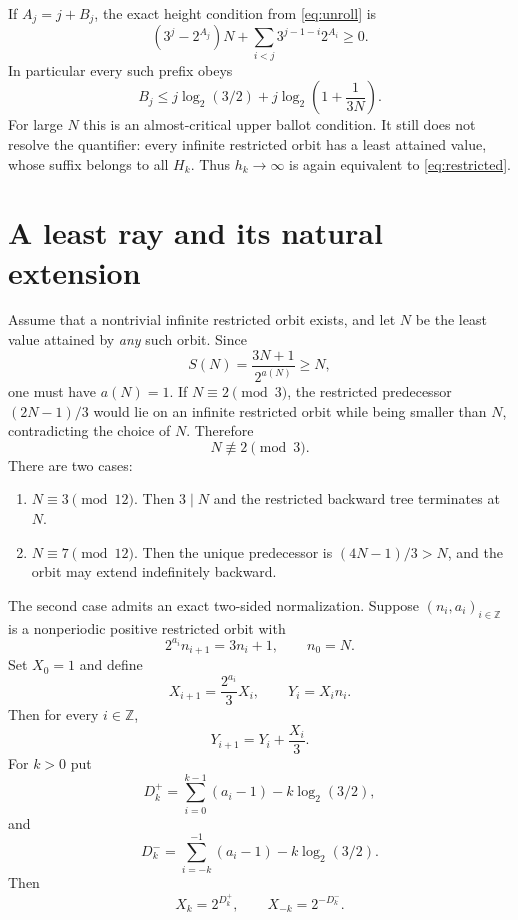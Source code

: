 \documentclass[11pt,reqno]{amsart}
\theoremstyle{plain}
\theoremstyle{definition}
\numberwithin{equation}{section}
\newcommand{\Z}{\mathbb{Z}}
\begin{document}
If $A_j=j+B_j$, the exact height condition from \eqref{eq:unroll} is
\begin{equation}\label{eq:heightcond}
(3^j-2^{A_j})N+
\sum_{i<j}3^{j-1-i}2^{A_i}\ge0.
\end{equation}
In particular every such prefix obeys
\begin{equation}\label{eq:ballot}
B_j
\le
j\log_2(3/2)+
j\log_2\left(1+\frac1{3N}\right).
\end{equation}
For large $N$ this is an almost-critical upper ballot condition.  It still
does not resolve the quantifier: every infinite restricted orbit has a least
attained value, whose suffix belongs to all $H_k$.  Thus $h_k\to\infty$ is
again equivalent to \eqref{eq:restricted}.

\section{A least ray and its natural extension}
\label{sec:ray}

Assume that a nontrivial infinite restricted orbit exists, and let $N$ be
the least value attained by \emph{any} such orbit.  Since
\[
S(N)=\frac{3N+1}{2^{a(N)}}\ge N,
\]
one must have $a(N)=1$.  If $N\equiv2\pmod3$, the restricted predecessor
$(2N-1)/3$ would lie on an infinite restricted orbit while being smaller
than $N$, contradicting the choice of $N$.  Therefore
\[
N\not\equiv2\pmod3.
\]
There are two cases:
\begin{enumerate}
  \item $N\equiv3\pmod{12}$.  Then $3\mid N$ and the restricted backward tree
        terminates at $N$.
  \item $N\equiv7\pmod{12}$.  Then the unique predecessor is
        $(4N-1)/3>N$, and the orbit may extend indefinitely backward.
\end{enumerate}

The second case admits an exact two-sided normalization.  Suppose
$(n_i,a_i)_{i\in\Z}$ is a nonperiodic positive restricted orbit with
\[
2^{a_i}n_{i+1}=3n_i+1,
\qquad n_0=N.
\]
Set $X_0=1$ and define
\[
X_{i+1}=\frac{2^{a_i}}3X_i,
\qquad Y_i=X_in_i.
\]
Then for every $i\in\Z$,
\begin{equation}\label{eq:twosidedY}
Y_{i+1}=Y_i+\frac{X_i}{3}.
\end{equation}
For $k>0$ put
\[
D_k^+=\sum_{i=0}^{k-1}(a_i-1)-k\log_2(3/2),
\]
and
\[
D_k^-=\sum_{i=-k}^{-1}(a_i-1)-k\log_2(3/2).
\]
Then
\[
X_k=2^{D_k^+},
\qquad
X_{-k}=2^{-D_k^-}.
\]
\end{document}
